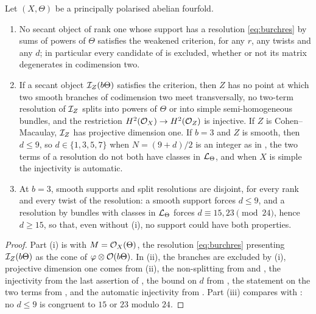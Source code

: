 \begin{corollary}
\label{cor:disjointroutes}
Let $(X,\Theta)$ be a principally polarised abelian fourfold.
\begin{enumerate}[label=\textup{(\roman*)},nosep]
\item No secant object of rank one whose support has a resolution
  \eqref{eq:burchres} by sums of powers of $\Theta$ satisfies the weakened
  criterion, for any $r$, any twists and any $d$; in particular every
  candidate of  is excluded, whether or not its matrix
  degenerates in codimension two.
\item If a secant object $\mathcal{I}_{Z}(b\Theta)$ satisfies the criterion, then
  $Z$ has no point at which two smooth branches of codimension two meet
  transversally, no two-term resolution of $\mathcal{I}_{Z}$ splits into powers of
  $\Theta$ or into simple semi-homogeneous bundles, and the restriction
  $H^{2}(\mathcal{O}_{X})\to H^{2}(\mathcal{O}_{Z})$ is injective. If $Z$ is
  Cohen--Macaulay, $\mathcal{I}_{Z}$ has projective dimension one. If $b=3$ and $Z$
  is smooth, then $d\le9$, so $d\in\{1,3,5,7\}$ when $N=(9+d)/2$ is an
  integer as in , the two terms of a resolution do not
  both have classes in $\mathcal{L}_{\Theta}$, and when $X$ is simple the
  injectivity is automatic.
\item At $b=3$, smooth supports and split resolutions are disjoint, for
  every rank and every twist of the resolution: a smooth support forces
  $d\le9$, and a resolution by bundles with classes in $\mathcal{L}_{\Theta}$ forces
  $d\equiv15,23\pmod{24}$, hence $d\ge15$, so that, even without (i), no
  support could have both properties.
\end{enumerate}
\end{corollary}

\begin{proof}
Part (i) is  with $M=\mathcal{O}_{X}(\Theta)$, the resolution
\eqref{eq:burchres} presenting $\mathcal{I}_{Z}(b\Theta)$ as the cone of
$\varphi\otimes\mathcal{O}(b\Theta)$. In (ii), the branches are excluded by
(i), projective dimension one comes from
(ii), the non-splitting from  and
, the injectivity from the last assertion of
, the bound on $d$ from
, the statement on the two terms from
, and the automatic injectivity from
. Part (iii) compares
 with : no $d\le9$ is
congruent to $15$ or $23$ modulo $24$.
\end{proof}
